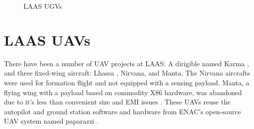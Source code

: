 \documentclass[a4paper,11pt]{report}
\begin{document}
\begin{figure}[htb]
  \centering
  \caption{LAAS UGVs}
  \label{fig:ugvs}
\end{figure}

\vspace{1cm}

\section{LAAS UAVs}

There have been a number of UAV projects at LAAS: A dirigible named Karma \cite{karma}, and three fixed-wing aircraft: Lhassa \cite{lhassa}, Nirvana, and Manta. The Nirvana aircrafts were used for formation flight \cite{gautier} and not equipped with a sensing payload. Manta, a flying wing with a payload based on commodity X86 hardware, was abandoned due to it's less than convenient size and EMI issues \cite{manta}. These UAVs reuse the autopilot and ground station software and hardware from ENAC's open-source UAV system named paparazzi \cite{paparazzi}.
\end{document}
